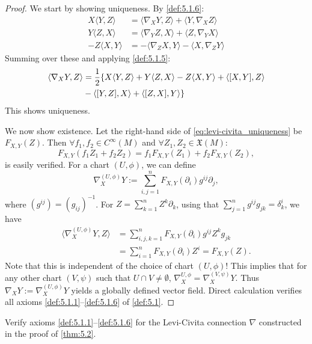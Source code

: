 \begin{proof}
We start by showing uniqueness. By \autoref{def:5.1.6}:
\[
\begin{aligned}
    X\langle Y, Z \rangle &= \langle \nabla_X Y, Z \rangle + \langle Y, \nabla_X Z \rangle\\
    Y \langle Z, X \rangle &= \langle \nabla_Y Z, X \rangle + \langle Z, \nabla_Y X \rangle\\
    - Z \langle X, Y \rangle &= - \langle \nabla_Z X, Y \rangle - \langle X, \nabla_Z Y \rangle
\end{aligned}
\]
Summing over these and applying \autoref{def:5.1.5}:
\begin{align}\label{eq:levi-civita_uniqueness}
\langle \nabla_XY, Z\rangle &= \frac12 \{X\langle Y, Z \rangle + Y \langle Z, X \rangle - Z \langle X, Y \rangle + \langle [X,Y], Z \rangle \notag \\
& - \langle [Y,Z], X \rangle + \langle [Z,X], Y \rangle\}
\end{align}
This shows uniqueness.

We now show existence. Let the right-hand side of \eqref{eq:levi-civita_uniqueness} be $F_{X,Y}(Z)$.
Then $\forall f_1, f_2 \in C^{\infty}(M)$ and $\forall Z_1, Z_2 \in \mathfrak{X}(M)$:
\[
F_{X, Y}(f_1 Z_1 + f_2Z_2) = f_1F_{X,Y}(Z_1) + f_2F_{X,Y}(Z_2),
\]
is easily verified. For a chart $(U, \phi)$, we can define
\[
\nabla_X^{(U,\phi)}Y := \sum_{i, j = 1}^{n}F_{X,Y}(\partial_i)g^{ij}\partial_j,
\]
where $(g^{ij})=(g_{ij})^{-1}$. For $Z = \sum_{k=1}^n Z^k\partial_k$, using that $\sum_{j=1}^n g^{ij}g_{jk}=\delta^i_k$, we have
\[
\begin{aligned}
\langle \nabla_X^{(U,\phi)}Y, Z \rangle &= \sum_{i,j,k = 1}^n F_{X,Y}(\partial_i)g^{ij}Z^k g_{jk} \\
&= \sum_{i=1}^n F_{X,Y}(\partial_i)Z^i = F_{X,Y}(Z).
\end{aligned}
\]
Note that this is independent of the choice of chart $(U,\phi)$! This implies that for any other chart $(V, \psi)$ such that $U \cap V \neq \emptyset$, $\nabla_X^{U,\phi} = \nabla_X^{(V,\psi)}Y$.
Thus $\nabla_X Y := \nabla_X^{(U, \phi)}Y$ yields a globally defined vector field. Direct calculation verifies all axioms \autoref{def:5.1.1}--\autoref{def:5.1.6} of \autoref{def:5.1}.
\end{proof}

\begin{problem}
Verify axioms \autoref{def:5.1.1}--\autoref{def:5.1.6} for the Levi-Civita connection $\nabla$ constructed in the proof of \autoref{thm:5.2}.
\end{problem}


